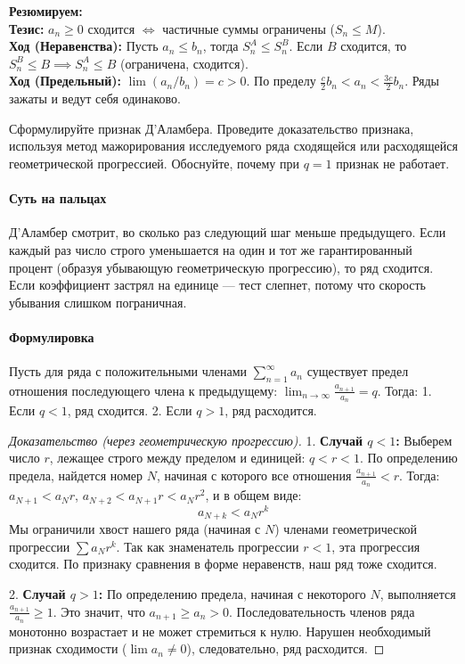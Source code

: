 \begin{tcolorbox}[colback=gray!5, colframe=black, boxrule=0.5pt, arc=0pt]
\textbf{Резюмируем:} \\
\textbf{Тезис:} $a_n \ge 0$ сходится $\iff$ частичные суммы ограничены ($S_n \le M$). \\
\textbf{Ход (Неравенства):} Пусть $a_n \le b_n$, тогда $S_n^A \le S_n^B$. Если $B$ сходится, то $S_n^B \le B \implies S_n^A \le B$ (ограничена, сходится). \\
\textbf{Ход (Предельный):} $\lim (a_n/b_n) = c > 0$. По пределу $\frac{c}{2} b_n < a_n < \frac{3c}{2} b_n$. Ряды зажаты и ведут себя одинаково.
\end{tcolorbox}


{Сформулируйте признак Д'Аламбера. Проведите доказательство признака, используя метод мажорирования исследуемого ряда сходящейся или расходящейся геометрической прогрессией. Обоснуйте, почему при $q=1$ признак не работает.}

\paragraph{Суть на пальцах}
Д'Аламбер смотрит, во сколько раз следующий шаг меньше предыдущего. Если каждый раз число строго уменьшается на один и тот же гарантированный процент (образуя убывающую геометрическую прогрессию), то ряд сходится. Если коэффициент застрял на единице — тест слепнет, потому что скорость убывания слишком пограничная.

\paragraph{Формулировка}
Пусть для ряда с положительными членами $\sum_{n=1}^\infty a_n$ существует предел отношения последующего члена к предыдущему: $\lim_{n \to \infty} \frac{a_{n+1}}{a_n} = q$.
Тогда:
1. Если $q < 1$, ряд сходится.
2. Если $q > 1$, ряд расходится.

\begin{proof}[Доказательство (через геометрическую прогрессию)]
1. \textbf{Случай $q < 1$:} Выберем число $r$, лежащее строго между пределом и единицей: $q < r < 1$. По определению предела, найдется номер $N$, начиная с которого все отношения $\frac{a_{n+1}}{a_n} < r$. 
Тогда: $a_{N+1} < a_N r$, $a_{N+2} < a_{N+1} r < a_N r^2$, и в общем виде:
$$ a_{N+k} < a_N r^k $$
Мы ограничили хвост нашего ряда (начиная с $N$) членами геометрической прогрессии $\sum a_N r^k$. Так как знаменатель прогрессии $r < 1$, эта прогрессия сходится. По признаку сравнения в форме неравенств, наш ряд тоже сходится.

2. \textbf{Случай $q > 1$:} По определению предела, начиная с некоторого $N$, выполняется $\frac{a_{n+1}}{a_n} \ge 1$. Это значит, что $a_{n+1} \ge a_n > 0$. Последовательность членов ряда монотонно возрастает и не может стремиться к нулю. Нарушен необходимый признак сходимости ($\lim a_n \neq 0$), следовательно, ряд расходится.
\end{proof}

